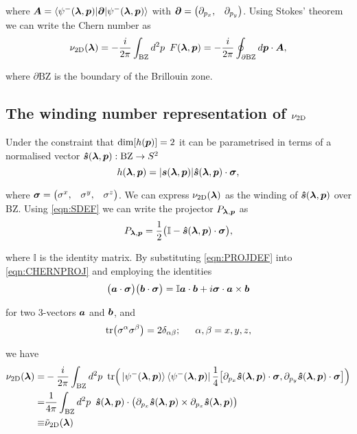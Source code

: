 \noi where $\boldsymbol{A}=\braket{\psi^{-}(\boldsymbol{\lambda},\boldsymbol{p})|\boldsymbol{\partial}|\psi^{-}(\boldsymbol{\lambda},\boldsymbol{p})}$ with $\boldsymbol{\partial}=\begin{pmatrix} \partial_{p_{x}},& \partial_{p_{y}}\end{pmatrix}$. Using Stokes' theorem we can write the Chern number as
\begin{equation}\label{eqn:BERRYDEF}
    \nu_{\text{2D}}(\boldsymbol{\lambda})=-\frac{i}{2\pi}\int_{\text{BZ}} d^{2}p \,\,\, F(\boldsymbol{\lambda},\boldsymbol{p}) = -\frac{i}{2\pi}\oint_{\partial\text{BZ}} d\boldsymbol{p}\cdot \boldsymbol{A},
\end{equation}

\noi where $\partial\text{BZ}$ is the boundary of the Brillouin zone.

\subsection{The winding number representation of $\nu_{\text{2D}}$}\label{sec:WINDNUMDER}

Under the constraint that $\text{dim}[h(\boldsymbol{p})]=2$ it can be parametrised in terms of a normalised vector $\boldsymbol{\hat{s}}(\boldsymbol{\lambda},\boldsymbol{p}):\text{BZ}\rightarrow S^{2}$
\begin{equation}\label{eqn:SDEF}
    h(\boldsymbol{\lambda},\boldsymbol{p}) = |\boldsymbol{s}(\boldsymbol{\lambda},\boldsymbol{p})|\boldsymbol{\hat{s}}(\boldsymbol{\lambda},\boldsymbol{p})\cdot\boldsymbol{\sigma},
\end{equation}

\noi where $\boldsymbol{\sigma}=\begin{pmatrix} \sigma^{x},&\sigma^{y},&\sigma^{z}\end{pmatrix}$. We can express $\nu_{\text{2D}}(\boldsymbol{\lambda})$ as the winding of $\boldsymbol{\hat{s}}(\boldsymbol{\lambda},\boldsymbol{p})$ over BZ. Using \eqref{eqn:SDEF} we can write the projector $P_{\boldsymbol{\lambda},\boldsymbol{p}}$ as
\begin{equation}\label{eqn:PROJDEF}
    P_{\boldsymbol{\lambda},\boldsymbol{p}}=\frac{1}{2}\big(\mathbb{I}-\boldsymbol{\hat{s}}(\boldsymbol{\lambda},\boldsymbol{p})\cdot\boldsymbol{\sigma}\big),
\end{equation}

\noi where $\mathbb{I}$ is the identity matrix. By substituting \eqref{eqn:PROJDEF} into \eqref{eqn:CHERNPROJ} and employing the identities
\begin{equation}
    \big(\boldsymbol{a}\cdot\boldsymbol{\sigma}\big)\big(\boldsymbol{b}\cdot\boldsymbol{\sigma}\big) = \mathbb{I}\boldsymbol{a}\cdot\boldsymbol{b}+i\boldsymbol{\sigma}\cdot\boldsymbol{a}\times\boldsymbol{b}
\end{equation}

\noi for two 3-vectors $\boldsymbol{a}$ and $\boldsymbol{b}$, and 
\begin{equation}
    \text{tr}\big(\sigma^{\alpha}\sigma^{\beta}\big)=2\delta_{\alpha\beta}; \,\,\,\,\,\,\,\,\, \alpha,\beta=x,y,z,
\end{equation}

\noi we have
\begin{align}\label{eqn:WINDDEF}
    \nu_{\text{2D}}(\boldsymbol{\lambda})=&-\frac{i}{2\pi}\int_{\text{BZ}}d^{2}p\,\,\, \text{tr}\Big(\ket{\psi^{-}(\boldsymbol{\lambda},\boldsymbol{p})}\bra{\psi^{-}(\boldsymbol{\lambda},\boldsymbol{p})}\frac{1}{4}\big[\partial_{p_{x}}\boldsymbol{\hat{s}}(\boldsymbol{\lambda},\boldsymbol{p})\cdot\boldsymbol{\sigma},\partial_{p_{y}}\boldsymbol{\hat{s}}(\boldsymbol{\lambda},\boldsymbol{p})\cdot\boldsymbol{\sigma}\big]\Big)\nonumber\\
    =&\frac{1}{4\pi}\int_{\text{BZ}}d^{2}p\,\,\, \boldsymbol{\hat{s}}(\boldsymbol{\lambda},\boldsymbol{p}) \cdot \big(\partial_{p_{x}}\boldsymbol{\hat{s}}(\boldsymbol{\lambda},\boldsymbol{p})\times\partial_{p_{x}}\boldsymbol{\hat{s}}(\boldsymbol{\lambda},\boldsymbol{p})\big)\nonumber\\
    \equiv & \tilde{\nu}_{\text{2D}}(\boldsymbol{\lambda})
\end{align}

